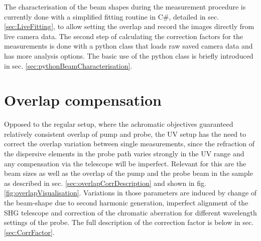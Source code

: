 \documentclass[twoside,openright,listof=numbered]{scrreprt}
\begin{document}
The characterisation of the beam shapes during the measurement procedure is currently done with a simplified fitting routine in C\#, detailed in sec. \ref{sec:LiveFitting}, to allow setting the overlap and record the images directly from live camera data. The second step of calculating the correction factors for the measurements is done with a python class that loads raw saved camera data and has more analysis options. The basic use of the python class is briefly introduced in sec. \ref{sec:pythonBeamCharacterisation}.
\section{Overlap compensation}\label{sec:overlapComp}
Opposed to the regular setup, where the achromatic objectives guaranteed relatively consistent overlap of pump and probe, the UV setup has the need to correct the overlap variation between single measurements, since the refraction of the dispersive elements in the probe path varies strongly in the UV range and any compensation via the telescope will be imperfect.\newline
Relevant for this are the beam sizes as well as the overlap of the pump and the probe beam in the sample as described in sec. \ref{sec:overlapCorrDescription} and shown in fig. \ref{fig:overlapVisualisation}. Variations in those parameters are induced by change of the beam-shape due to second harmonic generation, imperfect alignment of the SHG telescope and correction of the chromatic aberration for different wavelength settings of the probe. The full description of the correction factor is below in sec. \ref{sec:CorrFactor}.\\
\end{document}
